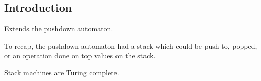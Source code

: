 
\subsection{Introduction}

Extends the pushdown automaton.

To recap, the pushdown automaton had a stack which could be push to, popped, or an operation done on top values on the stack.


Stack machines are Turing complete.

